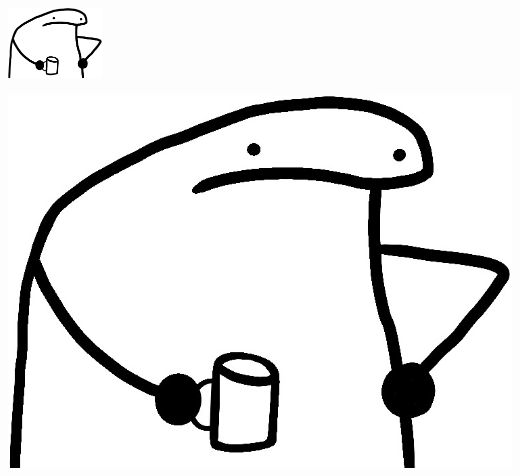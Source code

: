 \documentclass[
]{article}
\let\oldincludegraphics\includegraphics
\renewcommand{\includegraphics}[2][]{ \ifthenelse{ \equal{#1}{} } { \oldincludegraphics[width=2.5cm,height=2.5cm,keepaspectratio=true]{#2} } { \oldincludegraphics[#1]{#2} } }
\begin{document}
\includegraphics{./images/flork-cafe.jpg}
\end{document}
